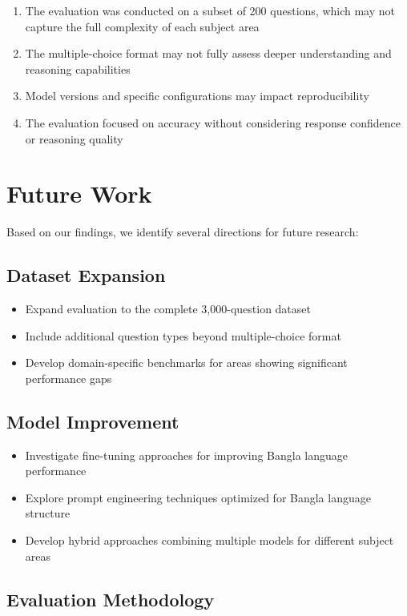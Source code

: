 \documentclass[11pt,a4paper]{article}
\begin{document}
\begin{enumerate}
    \item The evaluation was conducted on a subset of 200 questions, which may not capture the full complexity of each subject area
    \item The multiple-choice format may not fully assess deeper understanding and reasoning capabilities
    \item Model versions and specific configurations may impact reproducibility
    \item The evaluation focused on accuracy without considering response confidence or reasoning quality
\end{enumerate}

\section{Future Work}

Based on our findings, we identify several directions for future research:

\subsection{Dataset Expansion}

\begin{itemize}
    \item Expand evaluation to the complete 3,000-question dataset
    \item Include additional question types beyond multiple-choice format
    \item Develop domain-specific benchmarks for areas showing significant performance gaps
\end{itemize}

\subsection{Model Improvement}

\begin{itemize}
    \item Investigate fine-tuning approaches for improving Bangla language performance
    \item Explore prompt engineering techniques optimized for Bangla language structure
    \item Develop hybrid approaches combining multiple models for different subject areas
\end{itemize}

\subsection{Evaluation Methodology}
\end{document}

